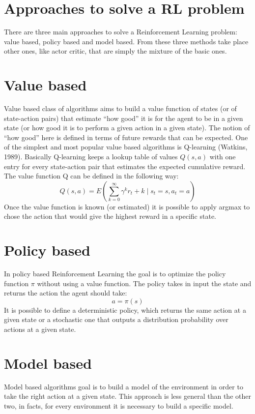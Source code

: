 \documentclass[binding=0.6cm,Lau,oneside]{sapthesis} %
\begin{document}
\section{Approaches to solve a RL problem}
There are three main approaches to solve a Reinforcement Learning problem: value based, policy based and model based. \newline
From these three methods take place other ones, like actor critic, that are simply the mixture of the basic ones.
\section{Value based}
Value based class of algorithms aims to build a value function of states (or of state-action pairs) that estimate “how good” it is for the agent to be in a given state (or how good it is to perform a given action in a given state). The notion of “how good” here is defined in terms of future rewards that can be expected. One of the simplest and most popular value based algorithms is Q-learning (Watkins, 1989). \newline
Basically Q-learning keeps a lookup table of values $Q(s,a)$ with one entry for every state-action pair that estimates the  expected cumulative reward. The value function Q can be defined in the following way:
\begin{equation}
Q( s,a ) = E( \sum_{k=0}^{\infty} \gamma^k r_t+k \mid s_t=s, a_t=a )
\end{equation}
Once the value function is known (or estimated) it is possible to apply argmax to chose the action that would give the highest reward in a specific state.
\section{Policy based}
In policy based Reinforcement Learning the goal is to optimize the policy function $\pi$ without using a value function. The policy takes in input the state and returns the action the agent should take:
\begin{equation}
a = \pi(s)
\end{equation}
It is possible to define a deterministic policy, which returns the same action at a given state or a stochastic one  that outputs a distribution probability over actions at a given state.
\section{Model based}
Model based algorithms goal is to build a model of the environment in order to take the right action at a given state. This approach is less general than the other two, in facts, for every environment it is necessary to build a specific model.
\end{document}
